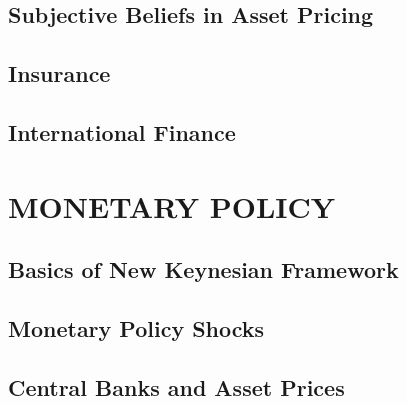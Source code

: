 \documentclass[
]{book}
\begin{document}
\hypertarget{subjective-beliefs-in-asset-pricing}{%
\chapter{Subjective Beliefs in Asset Pricing}\label{subjective-beliefs-in-asset-pricing}}

\hypertarget{insurance}{%
\chapter{Insurance}\label{insurance}}

\hypertarget{international-finance}{%
\chapter{International Finance}\label{international-finance}}

\hypertarget{part-monetary-policy}{%
\part*{MONETARY POLICY}\label{part-monetary-policy}}

\hypertarget{basics-of-new-keynesian-framework}{%
\chapter{Basics of New Keynesian Framework}\label{basics-of-new-keynesian-framework}}

\hypertarget{monetary-policy-shocks}{%
\chapter{Monetary Policy Shocks}\label{monetary-policy-shocks}}

\hypertarget{central-banks-and-asset-prices}{%
\chapter{Central Banks and Asset Prices}\label{central-banks-and-asset-prices}}

  
\end{document}
